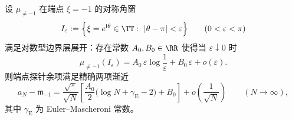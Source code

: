 \begin{theorem}\label{thm:xi-endpoint-logwindow-laplace-stieltjes}
设 \(\mu_{\neq -1}\) 在端点 \(\xi=-1\) 的对称角窗
\[
I_{\varepsilon}:=\Bigl\{\xi=e^{\mathrm{i}\theta}\in\TT:\ |\theta-\pi|<\varepsilon\Bigr\}\qquad(0<\varepsilon<\pi)
\]
满足对数型边界层展开：存在常数 \(A_0,B_0\in\RR\) 使得当 \(\varepsilon\downarrow 0\) 时
\begin{equation}\label{eq:xi-endpoint-logwindow-mass-expansion}
\mu_{\neq -1}(I_{\varepsilon})
=A_0\,\varepsilon\log\frac{1}{\varepsilon}+B_0\,\varepsilon+o(\varepsilon).
\end{equation}
则端点探针余项满足精确两项渐近
\begin{equation}\label{eq:xi-endpoint-logwindow-probe-asymptotic}
\boxed{\;
a_N-\mathfrak m_{-1}
=\frac{\sqrt{\pi}}{\sqrt N}\left[\frac{A_0}{2}\bigl(\log N+\gamma_{\mathrm E}-2\bigr)+B_0\right]
+o\!\left(\frac{1}{\sqrt N}\right)\qquad(N\to\infty),\;}
\end{equation}
其中 \(\gamma_{\mathrm E}\) 为 Euler--Mascheroni 常数。
\end{theorem}
